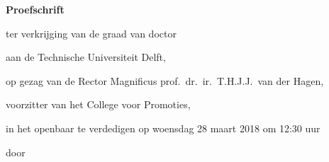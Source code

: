 \begin{titlepage}

\begin{center}

\vspace*{2\bigskipamount}

{\makeatletter
\titlestyle\bfseries\LARGE\@title
\makeatother}

{\makeatletter
\ifx\@subtitle\undefined\else
    \bigskip
    \titlefont\titleshape\Large\@subtitle
\fi
\makeatother}

\end{center}

\cleardoublepage
\thispagestyle{empty}

\begin{center}


\vspace*{2\bigskipamount}

{\makeatletter
\titlestyle\bfseries\LARGE\@title
\makeatother}

{\makeatletter
\ifx\@subtitle\undefined\else
    \bigskip
    \titlefont\titleshape\Large\@subtitle
\fi
\makeatother}

\vfill


{\Large\titlefont\bfseries Proefschrift}

\bigskip
\bigskip

ter verkrijging van de graad van doctor

aan de Technische Universiteit Delft,

op gezag van de Rector Magnificus prof.~dr.~ir.~T.H.J.J.~van der Hagen,

voorzitter van het College voor Promoties,

in het openbaar te verdedigen op woensdag 28 maart 2018 om 12:30 uur

\bigskip
\bigskip

door

\bigskip
\bigskip

\makeatletter
{\Large\titlefont\bfseries\@firstname\ {\titleshape\@lastname}}
\makeatother


\end{center}
\end{titlepage}
